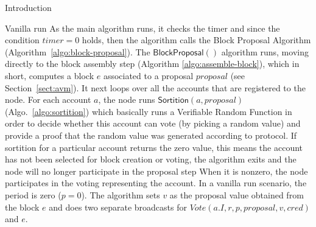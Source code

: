 \documentclass[10pt,a4paper]{article}
\begin{document}
\begin{section}{Introduction}
\begin{subsection}{Vanilla run}
As the main algorithm runs, it checks the timer and since the condition $timer=0$ holds,
then the algorithm calls the Block Proposal Algorithm (Algorithm~\ref{algo:block-proposal}).
The $\mathsf{BlockProposal}()$ algorithm runs, moving directly to the 
block assembly step (Algorithm \ref{algo:assemble-block}), which in short, computes a 
block $e$ associated to a proposal $proposal$ (see Section~\ref{sect:avm}).
It next loops over all the accounts that are registered to the node. 
For each account $a$, the node runs $\mathsf{Sortition}(a, proposal)$ (Algo.~\ref{algo:sortition}) 
which basically runs a Verifiable Random Function in order to decide whether this account 
can vote (by picking a random value) and provide a proof that the random value was generated according
to protocol.
If sortition for a particular account returns the zero value, this means the account has
not been selected for block creation or voting, the algorithm exits and the node will
no longer participate in the proposal step 
When it is nonzero, the node participates in the voting representing the account.
In a vanilla run scenario, the period is zero ($p=0$). The algorithm sets $v$ as 
the proposal value obtained from the block $e$ and does two separate broadcasts for 
$Vote(a.I, r,p, proposal, v, cred)$ and $e$.



\end{subsection}
\end{section}
\end{document}
